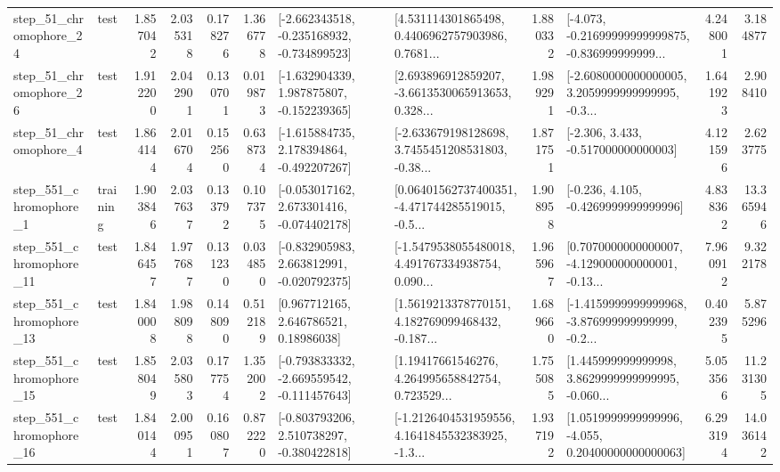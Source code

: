\begin{tabular}{llrrrrllrlrr}
   step\_51\_chromophore\_24 &      test &      1.857042 &    2.035318 &      0.178276 &  1.366778 &  [-2.662343518, -0.235168932, -0.734899523] &  [4.531114301865498, 0.4406962757903986, 0.7681... &       1.880332 &  [-4.073, -0.21699999999999875, -0.836999999999... &            4.248001 &          3.184877 \\
   step\_51\_chromophore\_26 &      test &      1.912200 &    2.042901 &      0.130701 &  0.019873 &   [-1.632904339, 1.987875807, -0.152239365] &  [2.693896912859207, -3.6613530065913653, 0.328... &       1.989291 &  [-2.6080000000000005, 3.2059999999999995, -0.3... &            1.641923 &          2.908410 \\
    step\_51\_chromophore\_4 &      test &      1.864144 &    2.016704 &      0.152560 &  0.638734 &   [-1.615884735, 2.178394864, -0.492207267] &  [-2.633679198128698, 3.7455451208531803, -0.38... &       1.871751 &                [-2.306, 3.433, -0.517000000000003] &            4.121596 &          2.623775 \\
   step\_551\_chromophore\_1 &  training &      1.903846 &    2.037637 &      0.133792 &  0.107375 &   [-0.053017162, 2.673301416, -0.074402178] &  [0.06401562737400351, -4.471744285519015, -0.5... &       1.908958 &               [-0.236, 4.105, -0.4269999999999996] &            4.838362 &         13.365946 \\
  step\_551\_chromophore\_11 &      test &      1.846457 &    1.977687 &      0.131230 &  0.034850 &   [-0.832905983, 2.663812991, -0.020792375] &  [-1.5479538055480018, 4.491767334938754, 0.090... &       1.965967 &  [0.7070000000000007, -4.129000000000001, -0.13... &            7.960912 &          9.322178 \\
  step\_551\_chromophore\_13 &      test &      1.840008 &    1.988098 &      0.148090 &  0.512189 &      [0.967712165, 2.646786521, 0.18986038] &  [1.5619213378770151, 4.182769099468432, -0.187... &       1.689660 &  [-1.4159999999999968, -3.876999999999999, -0.2... &            0.402395 &          5.875296 \\
  step\_551\_chromophore\_15 &      test &      1.858049 &    2.035803 &      0.177754 &  1.352002 &  [-0.793833332, -2.669559542, -0.111457643] &  [1.19417661546276, 4.264995658842754, 0.723529... &       1.755085 &  [1.445999999999998, 3.8629999999999995, -0.060... &            5.053566 &         11.231305 \\
  step\_551\_chromophore\_16 &      test &      1.840144 &    2.000951 &      0.160807 &  0.872220 &   [-0.803793206, 2.510738297, -0.380422818] &  [-1.2126404531959556, 4.1641845532383925, -1.3... &       1.937192 &  [1.0519999999999996, -4.055, 0.20400000000000063] &            6.293194 &         14.036142 \\

\end{tabular}

